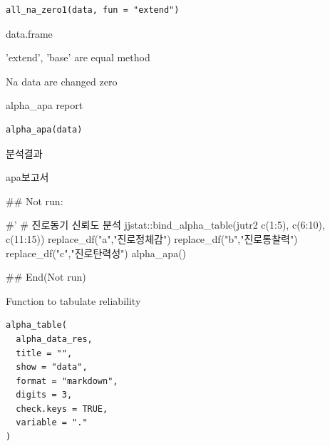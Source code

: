 \documentclass[a4paper]{book}
\begin{document}
%
\begin{Usage}
\begin{verbatim}
all_na_zero1(data, fun = "extend")
\end{verbatim}
\end{Usage}
%
\begin{Arguments}
\begin{ldescription}
\item[\code{data}] data.frame

\item[\code{fun}] 'extend', 'base' are equal method
\end{ldescription}
\end{Arguments}
%
\begin{Value}
Na data are changed zero
\end{Value}
%
\begin{Description}
alpha\_apa report
\end{Description}
%
\begin{Usage}
\begin{verbatim}
alpha_apa(data)
\end{verbatim}
\end{Usage}
%
\begin{Arguments}
\begin{ldescription}
\item[\code{data}] 분석결과
\end{ldescription}
\end{Arguments}
%
\begin{Value}
apa보고서
\end{Value}
%
\begin{Examples}
\begin{ExampleCode}
\#\# Not run: 

#'
# 진로동기 신뢰도 분석
jjstat::bind_alpha_table(jutr2%
                         c(1:5), c(6:10), c(11:15)) %
  replace_df("a","진로정체감") %
  replace_df("b","진로통찰력") %
  replace_df("c","진로탄력성") %
  alpha_apa()


## End(Not run)
\end{ExampleCode}
\end{Examples}
%
\begin{Description}
Function to tabulate reliability
\end{Description}
%
\begin{Usage}
\begin{verbatim}
alpha_table(
  alpha_data_res,
  title = "",
  show = "data",
  format = "markdown",
  digits = 3,
  check.keys = TRUE,
  variable = "."
)
\end{verbatim}
\end{Usage}
\end{document}
